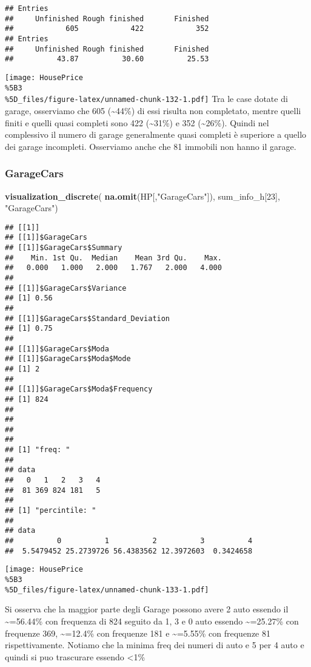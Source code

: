 \documentclass[
]{article}
\newenvironment{Shaded}{\begin{snugshade}}{\end{snugshade}}
\newcommand{\DecValTok}[1]{\textcolor[rgb]{0.00,0.00,0.81}{#1}}
\newcommand{\FunctionTok}[1]{\textcolor[rgb]{0.13,0.29,0.53}{\textbf{#1}}}
\newcommand{\NormalTok}[1]{#1}
\newcommand{\StringTok}[1]{\textcolor[rgb]{0.31,0.60,0.02}{#1}}
\begin{document}
\begin{verbatim}
## Entries
##     Unfinished Rough finished       Finished 
##            605            422            352 
## Entries
##     Unfinished Rough finished       Finished 
##          43.87          30.60          25.53
\end{verbatim}

\texttt{[image: HousePrice\\\%5B3\\\%5D\_files/figure-latex/unnamed-chunk-132-1.pdf]}
Tra le case dotate di garage, osserviamo che 605 (\textasciitilde44\%)
di essi risulta non completato, mentre quelli finiti e quelli quasi
completi sono 422 (\textasciitilde31\%) e 352 (\textasciitilde26\%).
Quindi nel complessivo il numero di garage generalmente quasi completi è
superiore a quello dei garage incompleti. Osserviamo anche che 81
immobili non hanno il garage.

\subsubsection{GarageCars}\label{garagecars}

\begin{Shaded}
\begin{Highlighting}[]
\FunctionTok{visualization\_discrete}\NormalTok{(}
  \FunctionTok{na.omit}\NormalTok{(HP[,}\StringTok{"GarageCars"}\NormalTok{]),}
\NormalTok{  sum\_info\_h[}\DecValTok{23}\NormalTok{],}
  \StringTok{"GarageCars"}\NormalTok{)}
\end{Highlighting}
\end{Shaded}

\begin{verbatim}
## [[1]]
## [[1]]$GarageCars
## [[1]]$GarageCars$Summary
##    Min. 1st Qu.  Median    Mean 3rd Qu.    Max. 
##   0.000   1.000   2.000   1.767   2.000   4.000 
## 
## [[1]]$GarageCars$Variance
## [1] 0.56
## 
## [[1]]$GarageCars$Standard_Deviation
## [1] 0.75
## 
## [[1]]$GarageCars$Moda
## [[1]]$GarageCars$Moda$Mode
## [1] 2
## 
## [[1]]$GarageCars$Moda$Frequency
## [1] 824
## 
## 
## 
## 
## [1] "freq: "
## 
## data
##   0   1   2   3   4 
##  81 369 824 181   5 
## 
## [1] "percintile: "
## 
## data
##          0          1          2          3          4 
##  5.5479452 25.2739726 56.4383562 12.3972603  0.3424658
\end{verbatim}

\texttt{[image: HousePrice\\\%5B3\\\%5D\_files/figure-latex/unnamed-chunk-133-1.pdf]}

Si osserva che la maggior parte degli Garage possono avere 2 auto
essendo il \textasciitilde=56.44\% con frequenza di 824 seguito da 1, 3
e 0 auto essendo \textasciitilde=25.27\% con frequenze 369,
\textasciitilde=12.4\% con frequenze 181 e \textasciitilde=5.55\% con
frequenze 81 rispettivamente. Notiamo che la minima freq dei numeri di
auto e 5 per 4 auto e quindi si puo trascurare essendo \textless1\%
\end{document}
